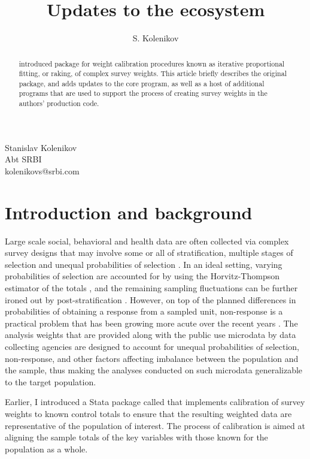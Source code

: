 \author{S. Kolenikov}{%
  Stanislav Kolenikov\\Abt SRBI\\kolenikovs@srbi.com
}
\title[Raking survey data]{Updates to the  ecosystem}
\maketitle

\begin{abstract}
\citet{kolenikov:2014 } introduced package  
for weight calibration procedures known as iterative proportional fitting,
or raking, of complex survey weights.
This article briefly describes the original package,
and adds updates to the core program, as well as a host of 
additional programs that are used to support the process of creating
survey weights in the authors' production code.

\end{abstract}

\section{Introduction and background}

Large scale social, behavioral and health data are often collected
via complex survey designs that may involve some or all of stratification,
multiple stages of selection and unequal probabilities of selection
\citep{korn:graubard:1995,korn:graubard:1999}.
In an ideal setting, varying probabilities of selection are
accounted for by using the Horvitz-Thompson estimator of the totals
\citep{horvitz:thompson:1952,thompson:1997}, and the remaining
sampling fluctuations can be further ironed out by
post-stratification \citep{holt:smith:1979}.
However, on top of the planned differences in probabilities of obtaining
a response from a sampled unit, non-response is a practical problem
that has been growing more acute over the recent years
\citep{groves:dillman:eltinge:little:2001,pew:2012}.
The analysis weights that are provided along with the public use
microdata by data collecting agencies are designed to account
for unequal probabilities of selection, non-response, and other factors
affecting imbalance between the population and the sample, thus making
the analyses conducted on such microdata generalizable to the target population.

Earlier, I introduced \citep{kolenikov:2014} a Stata package
called  that implements 
calibration of survey weights to known control totals to ensure
that the resulting weighted data are representative of the population
of interest. The process of calibration is aimed at aligning the sample totals
of the key variables with those known for the population as a whole.

